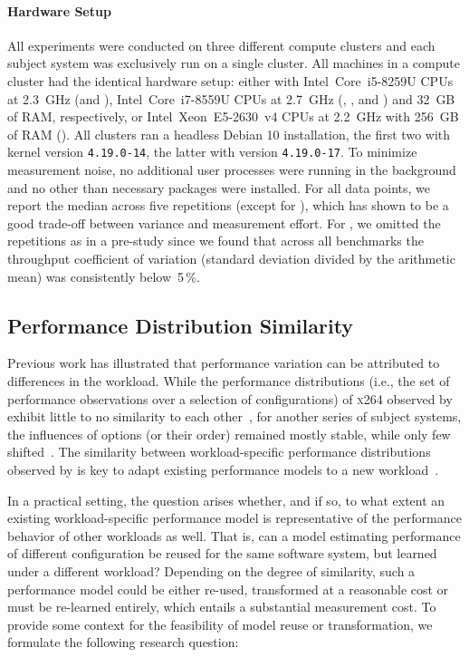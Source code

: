	\paragraph*{Hardware Setup}
	All experiments were conducted on three different compute clusters and each subject system was exclusively run on a single cluster. All machines in a compute cluster had the identical hardware setup: either with Intel~Core~i5-8259U CPUs at 2.3~GHz (\jumper and \kanzi),  Intel~Core~i7-8559U CPUs at 2.7~GHz (\dconvert, \batik, and \jadx) and 32~GB of RAM, respectively, or Intel~Xeon~E5-2630~v4 CPUs at 2.2~GHz with 256~GB of RAM (\htwo). All clusters ran a headless Debian 10 installation, the first two with kernel version \mbox{\texttt{4.19.0-14}}, the latter with version \mbox{\texttt{4.19.0-17}}. 
	To minimize measurement noise, no additional user processes were running in the background and no other than necessary packages were installed.
	For all data points, we report the median across five repetitions (except for \htwo), which has shown to be a good trade-off between variance and measurement effort. For \htwo, we omitted the repetitions as in a pre-study since we found that across all benchmarks the throughput coefficient of variation (standard deviation divided by the arithmetic mean) was consistently below~5\,\%. 


\subsection{Performance Distribution Similarity}\label{sec:rq1}
Previous work has illustrated that performance variation can be attributed to differences in the workload. While the performance distributions (i.e., the set of performance observations over a selection of configurations) of \textsc{x264} observed by \citeauthor{alves_sampling_2020} exhibit little to no similarity to each other~\cite{alves_sampling_2020}, for another series of subject systems, the influences of options (or their order) remained mostly stable, while only few shifted~\cite{jamshidi_transfer_gp_2017,jamishidi_transfer_2017}.  The similarity between workload-specific performance distributions observed by \citeauthor{jamshidi_learning_2018} is key to adapt existing performance models to a new workload~\cite{jamshidi_learning_2018}. 

In a practical setting, the question arises whether, and if so, to what extent an existing workload-specific performance model is representative of the performance behavior of other workloads as well. 
That is, can a model estimating performance of different configuration be reused for the same software system, but learned under a different workload?
Depending on the degree of similarity, such a performance model could be either re-used, transformed at a reasonable cost or must be re-learned entirely, which entails a substantial measurement cost. To provide some context for the feasibility of model reuse or transformation, we formulate the following research question: 

